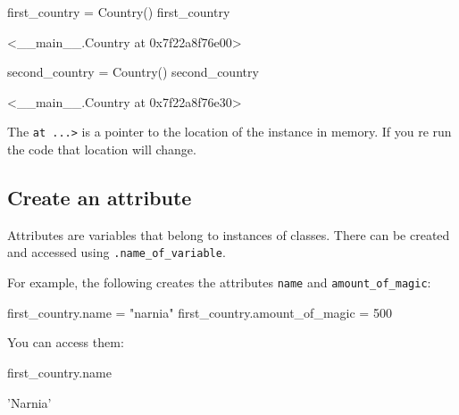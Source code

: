 \begin{pyin}
first_country = Country()
first_country
\end{pyin}





\begin{raw}
<__main__.Country at 0x7f22a8f76e00>
\end{raw}









\begin{pyin}
second_country = Country()
second_country
\end{pyin}





\begin{raw}
<__main__.Country at 0x7f22a8f76e30>
\end{raw}


The \texttt{at ...>} is a pointer to the location of the instance in memory. If you re run
the code that location will change.


\subsection{Create an attribute}

Attributes are variables that belong to instances of classes. There can be
created and accessed using \texttt{.name\_of\_variable}.


For example, the following creates the attributes \texttt{name} and
\texttt{amount\_of\_magic}:




\begin{pyin}
first_country.name = "narnia"
first_country.amount_of_magic = 500
\end{pyin}





You can access them:




\begin{pyin}
first_country.name
\end{pyin}





\begin{raw}
'Narnia'
\end{raw}








